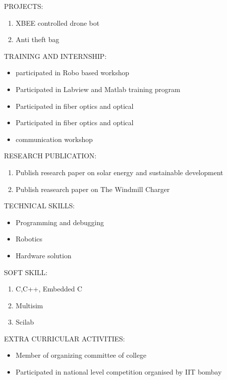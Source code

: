 \documentclass[11pt,a4paper]{article}
\begin{document}
\begin{flushleft}
		\textsf{PROJECTS:}\\
		\begin{enumerate}
			\item  XBEE controlled drone bot
			\item  Anti theft bag
		\end{enumerate}
			\textsf{TRAINING AND INTERNSHIP:}\\
			\begin{itemize}
				\item  participated in Robo based workshop\\
				\item  Participated in Labview and Matlab training program\\
				\item  Participated in fiber optics and optical\\
				\item  Participated in fiber optics and optical\\
				\item communication workshop
			\end{itemize}
				\textsf{RESEARCH PUBLICATION:}
				\begin{enumerate}
					\item Publish research paper on solar energy and sustainable development\\ 
					\item Publish reasearch paper on The Windmill Charger\\ 
				\end{enumerate} 
			\textsf{TECHNICAL SKILLS:}\\
			\begin{itemize}
				\item Programming and debugging\\
				\item Robotics \\
				\item Hardware solution\\
			\end{itemize}
				\textsf{SOFT SKILL:}\\
				\begin{enumerate}
					\item C,C++, Embedded C\\
					\item Multisim\\
					\item Scilab\\
	          \end{enumerate}
	          \textsf{EXTRA CURRICULAR ACTIVITIES:}\\
	          
	          \begin{itemize}
	          	\item Member of organizing committee of college\\
	          	\item Participated in national level competition organised by IIT bombay\\
	          	
	          \end{itemize}
\end{flushleft}

 
\end{document}
